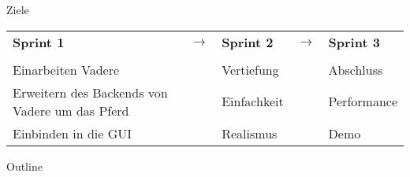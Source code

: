 \begin{frame}{Ziele}

\begin{table}
\centering
\begin{tabular}{ l c l c l }
\huge \textbf{Sprint 1} & \huge \textbf{$\rightarrow$} & \huge \textbf{Sprint 2} & \huge \textbf{$\rightarrow$} & \huge \textbf{Sprint 3} \\ \\
Einarbeiten Vadere & & Vertiefung & & Abschluss\\
Erweitern des Backends von Vadere um das Pferd & & Einfachkeit & & Performance\\
Einbinden in die GUI  & & Realismus  & & Demo\\
\end{tabular}
\end{table}

\end{frame}

\begin{frame}{Outline}

	\begin{scriptsize}
		\tableofcontents
	\end{scriptsize}

\end{frame}
